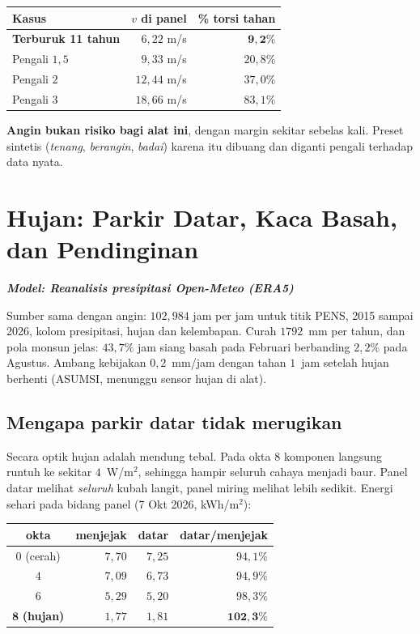 \documentclass[11pt,a4paper]{article}
\newcommand{\model}[1]{\textbf{\textit{Model: #1}}}
\begin{document}
\begin{longtable}{l r r}
\toprule
\textbf{Kasus} & $v$ \textbf{di panel} & \textbf{\% torsi tahan} \\
\midrule
\textbf{Terburuk 11 tahun} & $6{,}22$ m/s & $\bm{9{,}2\%}$ \\
Pengali $1{,}5$ & $9{,}33$ m/s & $20{,}8\%$ \\
Pengali $2$ & $12{,}44$ m/s & $37{,}0\%$ \\
Pengali $3$ & $18{,}66$ m/s & $83{,}1\%$ \\
\bottomrule
\end{longtable}

\textbf{Angin bukan risiko bagi alat ini}, dengan margin sekitar sebelas kali. Preset sintetis
(\emph{tenang}, \emph{berangin}, \emph{badai}) karena itu dibuang dan diganti pengali terhadap data nyata.

\section{Hujan: Parkir Datar, Kaca Basah, dan Pendinginan}

\model{Reanalisis presipitasi Open-Meteo (ERA5)}

Sumber sama dengan angin: $102{,}984$ jam per jam untuk titik PENS, 2015 sampai 2026, kolom presipitasi,
hujan dan kelembapan. Curah $1792$~mm per tahun, dan pola monsun jelas: $43{,}7\%$ jam siang basah pada
Februari berbanding $2{,}2\%$ pada Agustus. Ambang kebijakan $0{,}2$~mm/jam dengan tahan $1$~jam setelah
hujan berhenti (ASUMSI, menunggu sensor hujan di alat).

\subsection{Mengapa parkir datar tidak merugikan}

Secara optik hujan adalah mendung tebal. Pada okta 8 komponen langsung runtuh ke sekitar $4$~W/m$^2$,
sehingga hampir seluruh cahaya menjadi baur. Panel datar melihat \emph{seluruh} kubah langit, panel miring
melihat lebih sedikit. Energi sehari pada bidang panel (7 Okt 2026, kWh/m$^2$):

\begin{longtable}{c r r r}
\toprule
\textbf{okta} & \textbf{menjejak} & \textbf{datar} & \textbf{datar/menjejak} \\
\midrule
$0$ (cerah) & $7{,}70$ & $7{,}25$ & $94{,}1\%$ \\
$4$ & $7{,}09$ & $6{,}73$ & $94{,}9\%$ \\
$6$ & $5{,}29$ & $5{,}20$ & $98{,}3\%$ \\
$\bm{8}$ \textbf{(hujan)} & $1{,}77$ & $1{,}81$ & $\bm{102{,}3\%}$ \\
\bottomrule
\end{longtable}
\end{document}
